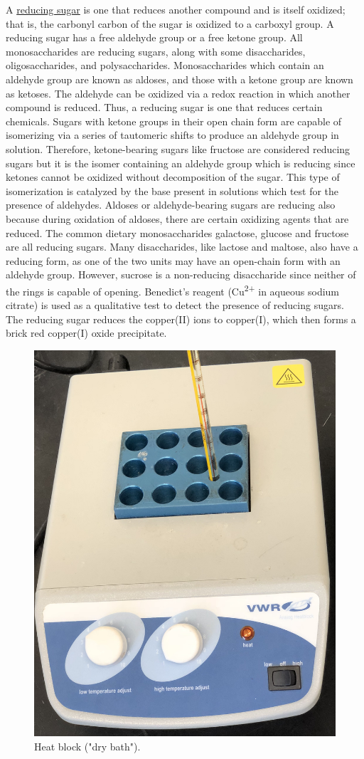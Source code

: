 A \href{https://en.wikipedia.org/wiki/Reducing_sugar}{reducing sugar} is
one that reduces another compound and is itself oxidized; that is, the
carbonyl carbon of the sugar is oxidized to a carboxyl group. A reducing
sugar has a free aldehyde group or a free ketone group. All
monosaccharides are reducing sugars, along with some disaccharides,
oligosaccharides, and polysaccharides. Monosaccharides which contain an
aldehyde group are known as aldoses, and those with a ketone group are
known as ketoses. The aldehyde can be oxidized via a redox reaction in
which another compound is reduced. Thus, a reducing sugar is one that
reduces certain chemicals. Sugars with ketone groups in their open chain
form are capable of isomerizing via a series of tautomeric shifts to
produce an aldehyde group in solution. Therefore, ketone-bearing sugars
like fructose are considered reducing sugars but it is the isomer
containing an aldehyde group which is reducing since ketones cannot be
oxidized without decomposition of the sugar. This type of isomerization
is catalyzed by the base present in solutions which test for the
presence of aldehydes. Aldoses or aldehyde-bearing sugars are reducing
also because during oxidation of aldoses, there are certain oxidizing
agents that are reduced. The common dietary monosaccharides galactose,
glucose and fructose are all reducing sugars. Many disaccharides, like
lactose and maltose, also have a reducing form, as one of the two units
may have an open-chain form with an aldehyde group. However, sucrose is
a non-reducing disaccharide since neither of the rings is capable of
opening. Benedict's reagent (Cu\textsuperscript{2+} in aqueous sodium
citrate) is used as a qualitative test to detect the presence of
reducing sugars. The reducing sugar reduces the copper(II) ions to
copper(I), which then forms a brick red copper(I) oxide precipitate.

\begin{figure}

{\centering \includegraphics[width=0.4\linewidth]{./figures/chem_aspects/Heatblock} 

}

\caption{Heat block ("dry bath").}\label{fig:heatblock}
\end{figure}

